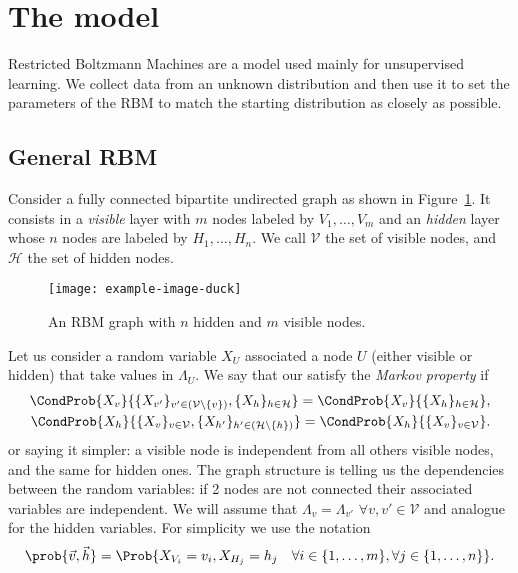 \section{The model}
  Restricted Boltzmann Machines are a model used mainly for unsupervised learning. We collect
  data from an unknown distribution and then use it to set the parameters of the RBM to match
  the starting distribution as closely as possible.
  
  \subsection{General RBM}
  Consider a fully connected bipartite undirected graph as shown in Figure~\ref{fig:generalRBM}.
  It consists in a \emph{visible} layer with $m$ nodes labeled by \(V_1, \dots, V_m\) and an
  \emph{hidden} layer whose \(n\) nodes are labeled by \(H_1, \dots, H_n\). We call \(\mathcal{V}\)
  the set of visible nodes, and \(\mathcal{H}\) the set of hidden nodes.
  \begin{figure}
    \centering
    \texttt{[image: example-image-duck]}
    \caption{An RBM graph with \(n\) hidden and \(m\) visible nodes.}
    \label{fig:generalRBM}
  \end{figure}
  Let us consider a random variable \(X_U\) associated a node \(U\) (either visible or hidden)
  that take values in \(\Lambda_U\). We say that our  satisfy the \emph{Markov
  property} if 
  \begin{align*}
    \CondProb{X_v}{\{X_{v'}\}_{v'\in (\mathcal{V} \setminus \{v\})}, \{X_h\}_{h\in \mathcal{H}}} =
    \CondProb{X_v}{\{X_h\}_{h\in \mathcal{H}}}, \\
    \CondProb{X_h}{\{X_v\}_{v\in \mathcal{V}}, \{X_{h'}\}_{h'\in (\mathcal{H} \setminus \{h\})}} =
    \CondProb{X_h}{\{X_v\}_{v\in \mathcal{V}}}.
  \end{align*}
  or saying it simpler: a visible node is independent from all others visible nodes,
  and the same for hidden ones. The graph structure is telling us the dependencies between
  the random variables: if 2 nodes are not connected their associated variables are independent.
  We will assume that \(\Lambda_v = \Lambda_{v'} \,\, \forall v,v' \in \mathcal{V}\) and analogue
  for the hidden variables. For simplicity we use the notation
  \[\prob{\vec{v}, \vec{h}} = \Prob{X_{V_i} = v_i, X_{H_j} = h_j
                                    \quad\forall i \in \{1,\dots,m\}, \forall j \in \{1,\dots,n\}}.\]
  
